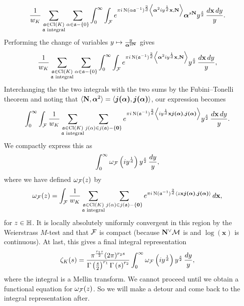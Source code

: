       \[
        \frac{1}{w_{K}}\sum_{\substack{\mathfrak{a} \in \operatorname{\mathrm{Cl}}(K) \\ \text{$\mathfrak{a}$ integral}}}\sum_{\alpha \in \mathfrak{a}-\{0\}}\int_{0}^{\infty}\int_{\mathcal{F}}e^{\pi i\operatorname{\mathrm{N}}(\alpha\mathfrak{a}^{-1})^{\frac{2}{d}}\left\langle\boldsymbol{\alpha}^{2}iy^{\frac{1}{d}}\mathbf{x},\mathbf{N}\right\rangle}\boldsymbol{\alpha}^{s\mathbf{N}}y^{\frac{s}{2}}\,\frac{d\mathbf{x}\,dy}{y}.
      \]
      Performing the change of variables $y \mapsto \frac{y}{\boldsymbol{\alpha}^{2\mathbf{N}}}$ gives
      \[
        \frac{1}{w_{K}}\sum_{\substack{\mathfrak{a} \in \operatorname{\mathrm{Cl}}(K) \\ \text{$\mathfrak{a}$ integral}}}\sum_{\alpha \in \mathfrak{a}-\{0\}}\int_{0}^{\infty}\int_{\mathcal{F}}e^{\pi i\operatorname{\mathrm{N}}(\mathfrak{a}^{-1})^{\frac{2}{d}}\left\langle\boldsymbol{\alpha}^{2}iy^{\frac{1}{d}}\mathbf{x},\mathbf{N}\right\rangle}y^{\frac{s}{2}}\,\frac{d\mathbf{x}\,dy}{y},
      \]
      Interchanging the the two integrals with the two sums by the Fubini–Tonelli theorem and noting that $\langle\mathbf{N},\boldsymbol{\alpha}^{2}\rangle = \langle\boldsymbol{j(\alpha)},\boldsymbol{j(\alpha)}\rangle$, our expression becomes
      \[
        \int_{0}^{\infty}\int_{\mathcal{F}}\frac{1}{w_{K}}\sum_{\substack{\mathfrak{a} \in \operatorname{\mathrm{Cl}}(K) \\ \text{$\mathfrak{a}$ integral}}}\sum_{j(\alpha) \in j(\mathfrak{a})-\{\mathbf{0}\}}e^{\pi i\operatorname{\mathrm{N}}(\mathfrak{a}^{-1})^{\frac{2}{d}}\left\langle iy^{\frac{1}{d}}\mathbf{x}\boldsymbol{j(\alpha)},\boldsymbol{j(\alpha)}\right\rangle}y^{\frac{s}{2}}\,\frac{d\mathbf{x}\,dy}{y}.
      \]
      We compactly express this as
      \[
        \int_{0}^{\infty}\omega_{\mathcal{F}}\left(iy^{\frac{1}{d}}\right)y^{\frac{s}{2}}\,\frac{dy}{y},
      \]
      where we have defined $\omega_{\mathcal{F}}(z)$ by
      \[
        \omega_{\mathcal{F}}(z) = \int_{\mathcal{F}}\frac{1}{w_{K}}\sum_{\substack{\mathfrak{a} \in \operatorname{\mathrm{Cl}}(K) \\ \text{$\mathfrak{a}$ integral}}}\sum_{j(\alpha) \in j(\mathfrak{a})-\{\mathbf{0}\}}e^{\pi i\operatorname{\mathrm{N}}(\mathfrak{a}^{-1})^{\frac{2}{d}}\langle z\mathbf{x}\boldsymbol{j(\alpha)},\boldsymbol{j(\alpha)}\rangle}\,d\mathbf{x},
      \]
      for $z \in \mathbb{H}$. It is locally absolutely uniformly convergent in this region by the Weierstrass $M$-test and that $\mathcal{F}$ is compact (because $\mathbf{N}^{\vee}\mathcal{M}$ is and $\log(\mathbf{x})$ is continuous). At last, this gives a final integral representation
      \begin{equation}\label{equ:integral_representation_Dedekind_1}
        \zeta_{K}(s) = \frac{\pi^{\frac{r_{1}s}{2}}(2\pi)^{r_{2}s}}{\Gamma\left(\frac{s}{2}\right)^{r_{1}}\Gamma\left(s\right)^{r_{2}}}\int_{0}^{\infty}\omega_{\mathcal{F}}\left(iy^{\frac{1}{d}}\right)y^{\frac{s}{2}}\,\frac{dy}{y},
      \end{equation}
      where the integral is a Mellin transform. We cannot proceed until we obtain a functional equation for $\omega_{\mathcal{F}}(z)$. So we will make a detour and come back to the integral representation after.
